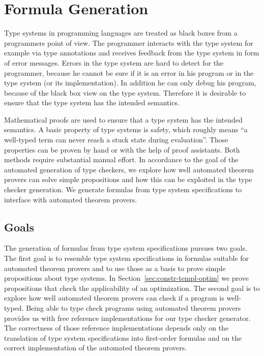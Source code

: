 \chapter{Formula Generation}
\label{ch:formula-generation}
Type systems in programming languages are treated as black boxes from
a programmers point of view. The programmer interacts with the type
system for example via type annotations and receives feedback from the
type system in form of error messages. Errors in the type system are
hard to detect for the programmer, because he cannot be sure if it is
an error in his program or in the type system (or its
implementation). In addition he can only debug his program, because of
the black box view on the type system. Therefore it is desirable to
ensure that the type system has the intended semantics.

Mathematical proofs are used to ensure that a type system has the
intended semantics. A basic property of type systems is safety, which
roughly means ``a well-typed term can never reach a stuck state during
evaluation''\cite{Pierce:2002:TPL:509043}. Those properties can be
proven by hand or with the help of proof assistants. Both methods
require substantial manual effort. In accordance to the goal of the
automated generation of type checkers, we explore how well automated
theorem provers can solve simple propositions and how this can be
exploited in the type checker generation. We generate formulas from
type system specifications to interface with automated theorem
provers.
 
\section{Goals}
The generation of formulas from type system specifications pursues two
goals. The first goal is to resemble type system specifications in
formulas suitable for automated theorem provers and to use those as a
basis to prove simple propositions about type systems. In
Section~\ref{sec:constr-templ-optim} we prove propositions that check
the applicability of an optimization. The second goal is to explore
how well automated theorem provers can check if a program is
well-typed. Being able to type check programs using automated theorem
provers provides us with free reference implementations for our type
checker generator. The correctness of those reference implementations
depends only on the translation of type system specifications into
first-order formulas and on the correct implementation of the
automated theorem provers.

